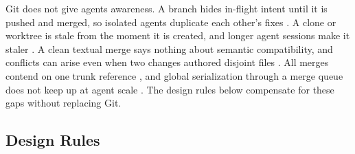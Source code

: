 \documentclass[11pt]{article}
\begin{document}
Git does not give agents awareness. A branch hides in-flight intent until it is pushed and merged, so isolated agents duplicate each other's fixes \cite{osmani2026cloud}. A clone or worktree is stale from the moment it is created, and longer agent sessions make it staler \cite{segner2026longsessions}. A clean textual merge says nothing about semantic compatibility, and conflicts can arise even when two changes authored disjoint files \cite{subramanian2026lineage}. All merges contend on one trunk reference \cite{celenza2026gitinfra}, and global serialization through a merge queue does not keep up at agent scale \cite{anthropic2026scion}. The design rules below compensate for these gaps without replacing Git.

\subsection{Design Rules}
\end{document}
